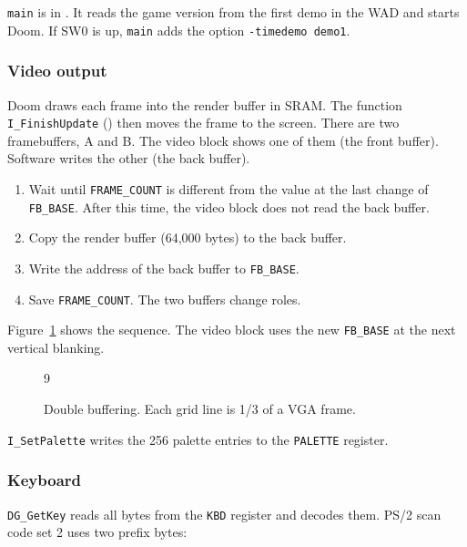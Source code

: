 \texttt{main} is in . It reads the game version from the first demo in the WAD and starts Doom. If SW0 is up, \texttt{main} adds the option \texttt{-timedemo demo1}.

\subsubsection{Video output}
Doom draws each frame into the render buffer in SRAM. The function \texttt{I\_FinishUpdate} () then moves the frame to the screen. There are two framebuffers, A and B. The video block shows one of them (the front buffer). Software writes the other (the back buffer).

\begin{enumerate}
  \item Wait until \texttt{FRAME\_COUNT} is different from the value at the last change of \texttt{FB\_BASE}. After this time, the video block does not read the back buffer.
  \item Copy the render buffer (64,000 bytes) to the back buffer.
  \item Write the address of the back buffer to \texttt{FB\_BASE}.
  \item Save \texttt{FRAME\_COUNT}. The two buffers change roles.
\end{enumerate}

Figure~\ref{fig:flip} shows the sequence. The video block uses the new \texttt{FB\_BASE} at the next vertical blanking.

\begin{figure}[H]
  \centering
  \begin{waveform}[1.45cm]{9}
  \end{waveform}
  \caption{Double buffering. Each grid line is 1/3 of a VGA frame.}
  \label{fig:flip}
\end{figure}

\texttt{I\_SetPalette} writes the 256 palette entries to the \texttt{PALETTE} register.

\subsubsection{Keyboard}
\texttt{DG\_GetKey} reads all bytes from the \texttt{KBD} register and decodes them. PS/2 scan code set 2 uses two prefix bytes:

